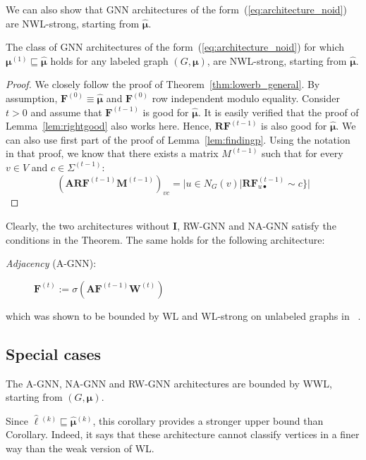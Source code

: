 We can also show that GNN architectures of the form~(\ref{eq:architecture_noid}) 
are NWL-strong, starting from $\hat{\pmb{\mu}}$.
\begin{proposition}
The class of GNN architectures of the form~(\ref{eq:architecture_noid}) for which 
	$\pmb{\mu}^{(1)}\sqsubseteq \hat{\pmb{\mu}}$ holds for any labeled graph $(G,\pmb{\mu})$, are NWL-strong, starting from $\hat{\pmb{\mu}}$.
\end{proposition}
\begin{proof}
We closely follow the proof of Theorem~\ref{thm:lowerb_general}.
 By assumption, $\mathbf{F}^{(0)}\equiv \hat{\pmb{\mu}}$ and $\mathbf{F}^{(0)}$
 row independent modulo equality. Consider $t>0$ and assume that $\mathbf{F}^{(t-1)}$ is good for $\hat{\pmb{\mu}}$. It is easily verified that the proof of Lemma~\ref{lem:rightgood} also works here. Hence, $\mathbf{R}\mathbf{F}^{(t-1)}$ is also good for  $\hat{\pmb{\mu}}$. We can also use first part of the proof of Lemma~\ref{lem:findingp}. Using the notation in that proof, we know that there exists a matrix $M^{(t-1)}$ such that for every $v\in V$ and $c\in\Sigma^{(t-1)}$:
 $$
 (\mathbf{A}\mathbf{R}\mathbf{F}^{(t-1)}\mathbf{M}^{(t-1)})_{vc}=|u\in N_G(v)| \mathbf{R}\mathbf{F}_{u\bullet}^{(t-1)}\sim c\}|
 $$

\end{proof}

Clearly, the two architectures without $\mathbf{I}$, RW-GNN and NA-GNN satisfy the conditions in the Theorem. The same holds for the following architecture:
\begin{description}
 \item[\textit{Adjacency} (A-GNN):]
$
\mathbf{F}^{(t)}:=\sigma\left(\mathbf{A}\mathbf{F}^{(t-1)}\mathbf{W}^{(t)}\right)
$
\end{description}
which was shown to be bounded by WL and WL-strong on unlabeled graphs in ~\cite{grohewl}.

\subsection{Special cases}
\begin{corollary}
The A-GNN,  NA-GNN  and RW-GNN architectures are bounded by WWL, starting from $(G,\pmb{\mu})$.	
\end{corollary}
Since $\hat{\pmb{\ell}}{}^{(k)}\sqsubseteq \hat{\pmb{\mu}}{}^{(k)}$, this corollary provides a stronger upper bound than Corollary. Indeed, it says that these architecture cannot classify vertices in a finer way than the weak version of WL. 

